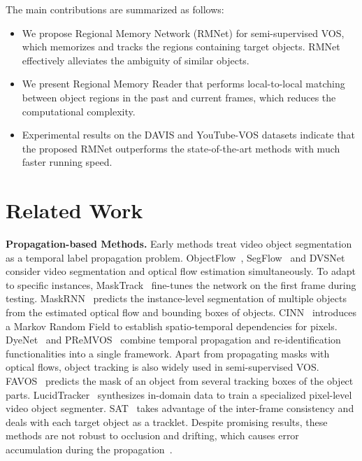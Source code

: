 \documentclass[final]{cvpr}
\begin{document}
The main contributions are summarized as follows:
\begin{itemize}
  \vspace{-2.5 mm}
  \item We propose Regional Memory Network (RMNet) for semi-supervised VOS, which memorizes and tracks the regions containing target objects. RMNet effectively alleviates the ambiguity of similar objects.
  \vspace{-2.5 mm}
  \item We present Regional Memory Reader that performs local-to-local matching between object regions in the past and current frames, which reduces the computational complexity.
  \vspace{-2.5 mm}
  \item Experimental results on the DAVIS and YouTube-VOS datasets indicate that the proposed RMNet outperforms the state-of-the-art methods with much faster running speed.
\end{itemize}


\section{Related Work}

\noindent \textbf{Propagation-based Methods.}
Early methods treat video object segmentation as a temporal label propagation problem.
ObjectFlow~\cite{DBLP:conf/cvpr/Tsai0B16}, SegFlow~\cite{DBLP:conf/iccv/ChengTW017} and DVSNet~\cite{DBLP:conf/cvpr/XuFYL18} consider video segmentation and optical flow estimation simultaneously.
To adapt to specific instances, MaskTrack~\cite{DBLP:conf/cvpr/PerazziKBSS17} fine-tunes the network on the first frame during testing.
MaskRNN~\cite{DBLP:conf/nips/HuHS17} predicts the instance-level segmentation of multiple objects from the estimated optical flow and bounding boxes of objects.
CINN~\cite{DBLP:conf/cvpr/BaoW018} introduces a Markov Random Field to  establish spatio-temporal dependencies for pixels.
DyeNet~\cite{DBLP:conf/eccv/LiL18} and PReMVOS~\cite{DBLP:conf/accv/LuitenVL18} combine temporal propagation and re-identification functionalities into a single framework.
Apart from propagating masks with optical flows, object tracking is also widely used in semi-supervised VOS.
FAVOS~\cite{DBLP:conf/cvpr/ChengTHW018} predicts the mask of an object from several tracking boxes of the object parts.
LucidTracker~\cite{DBLP:journals/ijcv/KhorevaBIBS19} synthesizes in-domain data to train a specialized pixel-level video object segmenter.
SAT~\cite{DBLP:conf/cvpr/ChenLYYSQ20} takes advantage of the inter-frame consistency and deals with each target object as a tracklet.
Despite promising results, these methods are not robust to occlusion and drifting, which causes error accumulation during the propagation~\cite{DBLP:conf/cvpr/OhLXK19}.
\end{document}
